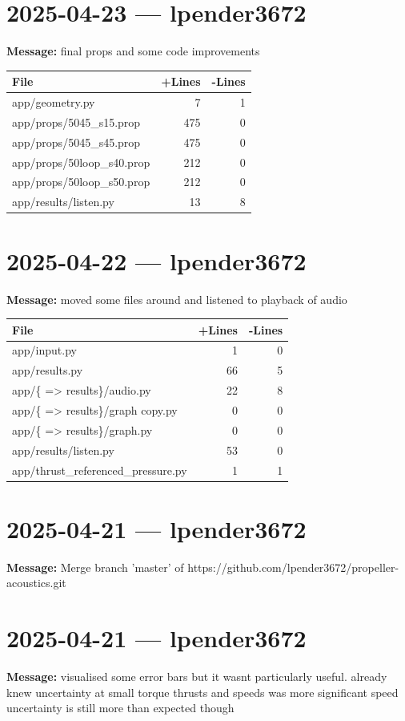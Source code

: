 \documentclass{article}
\begin{document}
\section*{2025-04-23 --- lpender3672}
\textbf{Message:} final props and some code improvements

\begin{longtable}{|p{10cm}|r|r|}
\hline \textbf{File} & \textbf{+Lines} & \textbf{-Lines} \\
\hline
app/geometry.py & 7 & 1 \\
\hline
app/props/5045\_s15.prop & 475 & 0 \\
\hline
app/props/5045\_s45.prop & 475 & 0 \\
\hline
app/props/50loop\_s40.prop & 212 & 0 \\
\hline
app/props/50loop\_s50.prop & 212 & 0 \\
\hline
app/results/listen.py & 13 & 8 \\
\hline
\end{longtable}

\section*{2025-04-22 --- lpender3672}
\textbf{Message:} moved some files around and listened to playback of audio

\begin{longtable}{|p{10cm}|r|r|}
\hline \textbf{File} & \textbf{+Lines} & \textbf{-Lines} \\
\hline
app/input.py & 1 & 0 \\
\hline
app/results.py & 66 & 5 \\
\hline
app/\{ => results\}/audio.py & 22 & 8 \\
\hline
app/\{ => results\}/graph copy.py & 0 & 0 \\
\hline
app/\{ => results\}/graph.py & 0 & 0 \\
\hline
app/results/listen.py & 53 & 0 \\
\hline
app/thrust\_referenced\_pressure.py & 1 & 1 \\
\hline
\end{longtable}

\section*{2025-04-21 --- lpender3672}
\textbf{Message:} Merge branch 'master' of https://github.com/lpender3672/propeller-acoustics.git

\section*{2025-04-21 --- lpender3672}
\textbf{Message:} visualised some error bars but it wasnt particularly useful. already knew uncertainty at small torque thrusts and speeds was more significant speed uncertainty is still more than expected though
\end{document}
